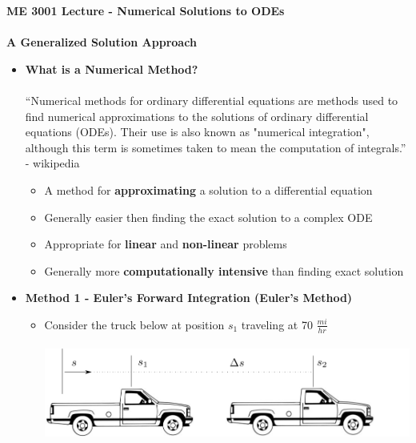 \documentclass[11pt]{article}
\begin{document}
\textbf{ \LARGE ME 3001 Lecture - Numerical Solutions to ODEs} \\\\
\textbf{ \LARGE A Generalized Solution Approach} \\

\begin{itemize}

	\item  \textbf{\LARGE What is a Numerical Method?} \\\\ \Large``Numerical methods for ordinary differential equations are methods used to find numerical approximations to the solutions of ordinary differential equations (ODEs). Their use is also known as "numerical integration", although this term is sometimes taken to mean the computation of integrals.'' - wikipedia\\
		\LARGE
		\begin{itemize}
			\item A method for {\bf approximating} a solution to a differential equation\\
			
			\item Generally easier then finding the exact solution to a complex ODE \\
			
			\item Appropriate for {\bf linear} and {\bf non-linear} problems \\
			
			\item Generally more {\bf computationally intensive} than finding exact solution \\
		\end{itemize}	

\newpage	
\item \textbf{\LARGE Method 1 - Euler's Forward Integration (Euler's Method)}\\

			\begin{itemize}
			\item Consider the truck below at position $s_1$ traveling at 70 $\frac{mi}{hr}$\\\\

			\includegraphics[scale=0.5]{lecture1_fig1.png}\\\\


\end{itemize}
\end{itemize}
\end{document}
